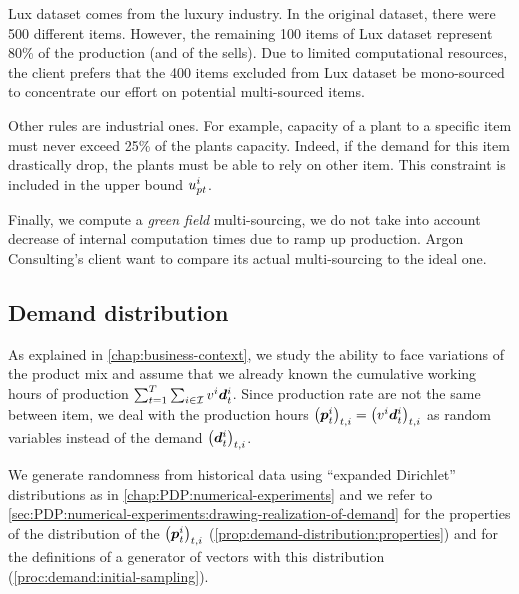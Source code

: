Lux dataset comes from the luxury industry.
In the original dataset, there were 500 different items.
However, the remaining 100 items of Lux dataset represent 80\% of the production (and of the sells).
Due to limited computational resources, the client prefers that the 400 items excluded from Lux dataset be mono-sourced to concentrate our effort on potential multi-sourced items.


Other rules are industrial ones.
For example, capacity of a plant to a specific item must never exceed 25\% of the plants capacity.
Indeed, if the demand for this item drastically drop, the plants must be able to rely on other item.
This constraint is included in the upper bound $u_{pt}^i$.


Finally, we compute a \emph{green field} multi-sourcing, \ie we do not take into account decrease of internal computation times due to ramp up production.
Argon Consulting's client want to compare its actual multi-sourcing to the ideal one.


\subsection{Demand distribution}
\label{sec:multi-sourcing:numerical-experiments:demand-distribution}




As explained in \cref{chap:business-context}, we study the ability to face variations of the product mix and assume that we already known the cumulative working hours of production $\sum_{t=1}^{\horizon}\sum_{i\in\REF}\rate^i\va\demand_t^i$.
Since production rate are not the same between item, we deal with the production hours $\bracket{\va p_t^i}_{t,i}=\bracket{\rate^i\va\demand_t^i}_{t,i}$ as random variables instead of the demand $\bracket{\va\demand_t^i}_{t,i}$.


We generate randomness from historical data using ``expanded Dirichlet'' distributions as in \cref{chap:PDP:numerical-experiments} and we refer to \cref{sec:PDP:numerical-experiments:drawing-realization-of-demand} for the properties of the distribution of the $\bracket{\va p_t^i}_{t,i}$ (\cref{prop:demand-distribution:properties}) and for the definitions of a generator of vectors with this distribution (\cref{proc:demand:initial-sampling}).


